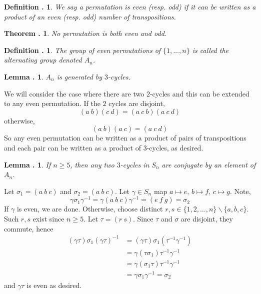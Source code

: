 \documentclass[twoside]{report}
\newcounter{Lecture}
\theoremstyle{myts}
\newcounter{c}[Lecture]
\newtheorem{dfn}[c]{Definition \arabic{Lecture}.}
\newtheorem{thm}[c]{Theorem \arabic{Lecture}.}
\newtheorem{lma}[c]{Lemma \arabic{Lecture}.}
\newcounter{ex}
\newenvironment{prf}{
  \noindent\begin{mdframed}[style=prf]}{\end{mdframed} \vspace{1em}
}
\begin{document}
\begin{dfn}
  We say a permutation is \emph{even} (resp. \emph{odd}) if it can be written as a product of an even (resp. odd) number of transpositions.
\end{dfn}

\begin{thm}
  No permutation is both even and odd.
\end{thm}

\begin{dfn}
  The group of even permutations of \( \{ 1 , \ldots , n \} \) is called the \emph{alternating group} denoted $A_n$.
\end{dfn}

\begin{lma}
  $A_n$ is generated by $3$-cycles.
\end{lma}

\begin{prf}
  We will consider the case where there are two $2$-cycles and this can be extended to any even permutation. If the $2$ cycles are disjoint, 
  \[
    ( a \: b ) ( c \: d ) = ( a \: c \: b ) ( a \: c \: d )
  \]
  otherwise,
  \[
    (a \: b ) ( a \: c ) = ( a \: c \: d)
  \]
  So any even permutation can be written as a product of pairs of transpositions and each pair can be written as a product of $3$-cycles, as desired.
\end{prf}

\begin{lma}
  If \( n \geq 5 \), then any two $3$-cycles in $S_n$ are conjugate by an element of $A_n$.
\end{lma}

\begin{prf}
  Let \( \sigma_1 = (a \: b \: c ) \) and \( \sigma_2 = ( a \: b \: c ) \). Let \( \gamma \in S_n \) map \(a\mapsto e\), \(b\mapsto f\), \(c\mapsto g\). Note,
  \[
    \gamma \sigma_1 \gamma^{-1} = \gamma ( a \: b \: c ) \gamma^{-1} = ( e \: f \: g ) = \sigma_2
  \]
  If $\gamma$ is even, we are done. Otherwise, choose distinct \( r,s \in \{ 1,2, \ldots , n \}\backslash \{ a,b,c\} \). Such $r,s$ exist since $n\geq 5$. Let \( \tau = ( r \: s ) \). Since $\tau$ and $\sigma$ are disjoint, they commute, hence
  \begin{align*}
    (\gamma\tau) \sigma_1 (\gamma\tau)^{-1} &= (\gamma\tau) \sigma_1 (\tau^{-1}\gamma^{-1}) \\
      &= \gamma (\tau\sigma_1) \tau^{-1}\gamma^{-1} \\
      &= \gamma (\sigma_1\tau) \tau^{-1}\gamma^{-1} \\
      &= \gamma \sigma_1 \gamma^{-1} = \sigma_2
  \end{align*}
  and \(\gamma\tau\) is even as desired.
\end{prf}
\end{document}

